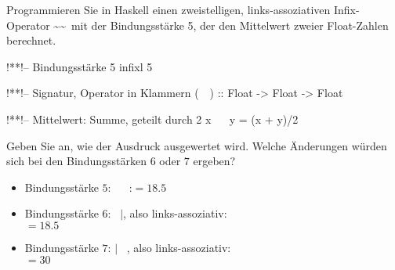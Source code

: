 \begin{frame}[fragile]\onslide<+->%
    \begin{exercise}[a) + b)]
        Programmieren Sie in Haskell einen zweistelligen, links-assoziativen Infix-Operator \textasciitilde\textasciitilde~mit der Bindungsstärke 5, der den Mittelwert zweier Float-Zahlen berechnet.
    \end{exercise}
    \begin{solve}[a) + b)]
    \begin{plainhaskell}
!*\onslide<+->*!-- Bindungsstärke 5
infixl 5 ~~

!*\onslide<+->*!-- Signatur, Operator in Klammern
(~~) :: Float -> Float -> Float

!*\onslide<+->*!-- Mittelwert: Summe, geteilt durch 2
x ~~ y = (x + y)/2
    \end{plainhaskell}
    \end{solve}
\end{frame}
\addtocounter{exercise}{-1}\addtocounter{solve}{-1}%
\begin{frame}\onslide<+->%
    \begin{exercise}[c)]
        Geben Sie an, wie der Ausdruck  ausgewertet wird. Welche Änderungen würden sich bei den Bindungsstärken $6$ oder $7$ ergeben?
    \end{exercise}
    \begin{solve}[c)]
    \begin{itemize}
        \item<+-> Bindungsstärke $5$: \bhaskell{*} \faAngleRight~\bhaskell{+} \faAngleRight{}~\bhaskell{\~~}:\hfill{}$= 18.5$
        \item<+-> Bindungsstärke $6$: \bhaskell{*} \faAngleRight~\bhaskell{+}$\mid$\bhaskell{\~~}, also links-assoziativ:\\\hfill{}$=18.5$
        \item<+-> Bindungsstärke $7$: \bhaskell{*}$\mid$\bhaskell{\~~} \faAngleRight~\bhaskell{+}, also links-assoziativ:\\\hfill{}$=30$
    \end{itemize}
    \end{solve}
\end{frame}
